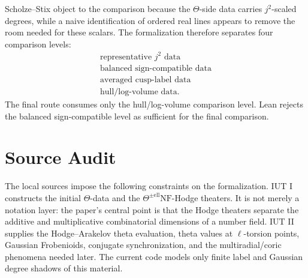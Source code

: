 \documentclass[11pt]{article}
\newcommand{\IUT}{IUT}
\newcommand{\Lean}{Lean}
\theoremstyle{plain}
\theoremstyle{definition}
\theoremstyle{remark}
\begin{document}
Scholze--Stix object to the comparison because the \(\Theta\)-side data carries
\(j^2\)-scaled degrees, while a naive identification of ordered real lines
appears to remove the room needed for these scalars.  The formalization
therefore separates four comparison levels:
\[
\begin{array}{c}
\text{representative }j^2\text{ data}\\
\text{balanced sign-compatible data}\\
\text{averaged cusp-label data}\\
\text{hull/log-volume data}.
\end{array}
\]
The final route consumes only the hull/log-volume comparison level.  \Lean{}
rejects the balanced sign-compatible level as sufficient for the final
comparison.

\section{Source Audit}

The local sources impose the following constraints on the formalization.
\IUT{} I constructs the initial \(\Theta\)-data and the
\(\Theta^{\pm\mathrm{ell}}\mathrm{NF}\)-Hodge theaters.  It is not merely a
notation layer: the paper's central point is that the Hodge theaters separate
the additive and multiplicative combinatorial dimensions of a number field.
\IUT{} II supplies the Hodge--Arakelov theta evaluation, theta values at
\(\ell\)-torsion points, Gaussian Frobenioids, conjugate synchronization, and
the multiradial/coric phenomena needed later.  The current code models only
finite label and Gaussian degree shadows of this material.
\end{document}
